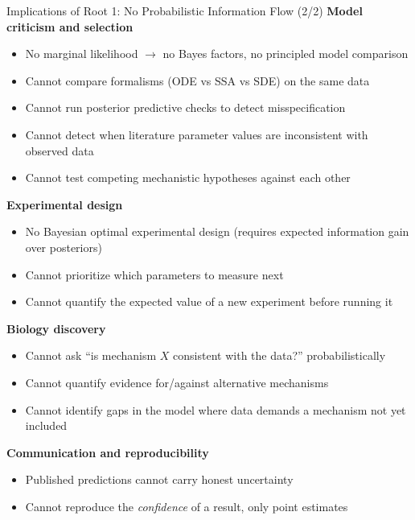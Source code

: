 \documentclass[aspectratio=169]{beamer}
\begin{document}
\begin{frame}[noframenumbering]{Implications of Root 1: No Probabilistic Information Flow (2/2)}
	\scriptsize
	\textbf{Model criticism and selection}
	\begin{itemize}\itemsep0pt\parskip0pt
		\item No marginal likelihood $\to$ no Bayes factors, no principled model comparison
		\item Cannot compare formalisms (ODE vs SSA vs SDE) on the same data
		\item Cannot run posterior predictive checks to detect misspecification
		\item Cannot detect when literature parameter values are inconsistent with observed data
		\item Cannot test competing mechanistic hypotheses against each other
	\end{itemize}

	\smallskip
	\textbf{Experimental design}
	\begin{itemize}\itemsep0pt\parskip0pt
		\item No Bayesian optimal experimental design (requires expected information gain over posteriors)
		\item Cannot prioritize which parameters to measure next
		\item Cannot quantify the expected value of a new experiment before running it
	\end{itemize}

	\smallskip
	\textbf{Biology discovery}
	\begin{itemize}\itemsep0pt\parskip0pt
		\item Cannot ask ``is mechanism $X$ consistent with the data?'' probabilistically
		\item Cannot quantify evidence for/against alternative mechanisms
		\item Cannot identify gaps in the model where data demands a mechanism not yet included
	\end{itemize}

	\smallskip
	\textbf{Communication and reproducibility}
	\begin{itemize}\itemsep0pt\parskip0pt
		\item Published predictions cannot carry honest uncertainty
		\item Cannot reproduce the \emph{confidence} of a result, only point estimates
	\end{itemize}
\end{frame}
\end{document}
